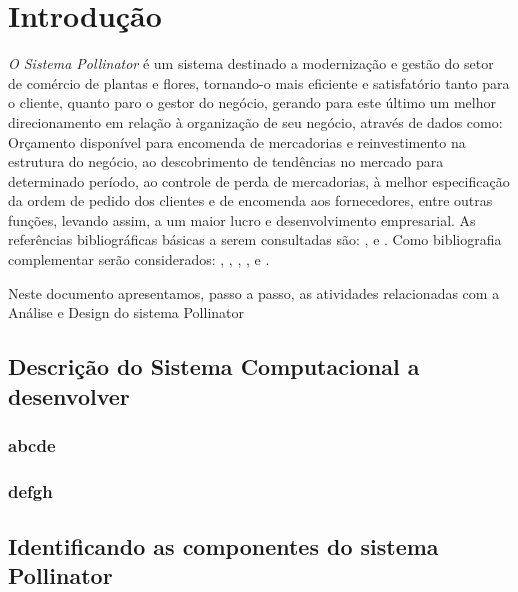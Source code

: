  
\chapter{ Introdu\c{c}\~{a}o}

\textit{ O Sistema Pollinator} \'{e} um sistema destinado a modernização e gestão do setor de com\'{e}rcio de plantas e flores, tornando-o mais eficiente e satisfatório tanto para o cliente, quanto paro o gestor do negócio, gerando para este último um melhor direcionamento em relação à organização de seu negócio, através de dados como: Orçamento disponível para encomenda de mercadorias e reinvestimento na estrutura do negócio, ao descobrimento de tendências no mercado para determinado período, ao controle de perda de mercadorias, à melhor especificação da ordem de pedido dos clientes e de encomenda aos fornecedores, entre outras funções, levando assim, a um maior lucro e desenvolvimento empresarial.  As refer\^{e}ncias bibliogr\'{a}ficas b\'{a}sicas a serem consultadas s\~{a}o: \cite{Dennis2014}, \cite{Dennis2019} \cite{Gane1983} e \cite{Sommerville2011}. Como bibliografia complementar ser\~{a}o considerados: \cite{Satzinger2012}, \cite{Shelly2012}, \cite{Valacich2020}, \cite{Kendall2020}, \cite{Budgen2021} e \cite{Engholm2013}.

Neste documento apresentamos, passo a passo,  as atividades relacionadas com a An\'{a}lise e Design do sistema Pollinator


 \section{Descri\c{c}\~{a}o do Sistema Computacional a desenvolver}

        \subsection{abcde}


        \subsection{defgh}

 \section{Identificando as componentes do sistema Pollinator}


